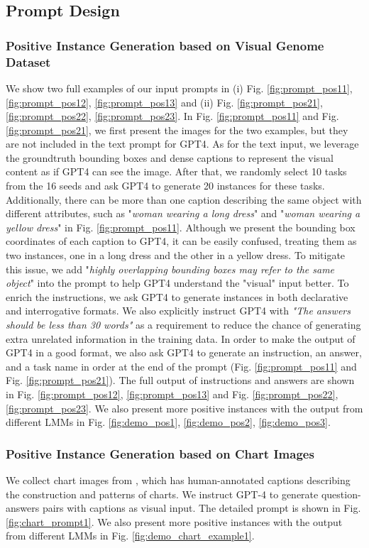\subsection{Prompt Design}
\subsubsection{Positive Instance Generation based on Visual Genome Dataset}
We show two full examples of our input prompts in (i) Fig. \ref{fig:prompt_pos11}, \ref{fig:prompt_pos12}, \ref{fig:prompt_pos13} and (ii) Fig. \ref{fig:prompt_pos21}, \ref{fig:prompt_pos22}, \ref{fig:prompt_pos23}. In Fig. \ref{fig:prompt_pos11} and Fig. \ref{fig:prompt_pos21}, we first present the images for the two examples, but they are not included in the text prompt for GPT4. As for the text input, we leverage the groundtruth bounding boxes and dense captions to represent the visual content as if GPT4 can see the image. After that, we randomly select 10 tasks from the 16 seeds and ask GPT4 to generate 20 instances for these tasks. Additionally, there can be more than one caption describing the same object with different attributes, such as "\textit{woman wearing a long dress}" and "\textit{woman wearing a yellow dress}" in Fig. \ref{fig:prompt_pos11}. Although we present the bounding box coordinates of each caption to GPT4, it can be easily confused, treating them as two instances, one in a long dress and the other in a yellow dress. To mitigate this issue, we add "\textit{highly overlapping bounding boxes may refer to the same object}" into the prompt to help GPT4 understand the "visual" input better. To enrich the instructions, we ask GPT4 to generate instances in both declarative and interrogative formats. We also explicitly instruct GPT4 with \textit{"The answers should be less than 30 words"} as a requirement to reduce the chance of generating extra unrelated information in the training data. In order to make the output of GPT4 in a good format, we also ask GPT4 to generate an instruction, an answer, and a task name in order at the end of the prompt (Fig. \ref{fig:prompt_pos11} and Fig. \ref{fig:prompt_pos21}). The full output of instructions and answers are shown in Fig. \ref{fig:prompt_pos12}, \ref{fig:prompt_pos13} and Fig. \ref{fig:prompt_pos22}, \ref{fig:prompt_pos23}. We also present more positive instances with the output from different LMMs in Fig. \ref{fig:demo_pos1}, \ref{fig:demo_pos2}, \ref{fig:demo_pos3}.

\subsubsection{Positive Instance Generation based on Chart Images}
We collect chart images from \citep{tang2023vistext}, which has human-annotated captions describing the construction and patterns of charts. We instruct GPT-4 to generate question-answers pairs with captions as visual input. The detailed prompt is shown in Fig. \ref{fig:chart_prompt1}. We also present more positive instances with the output from different LMMs in Fig. \ref{fig:demo_chart_example1}.

